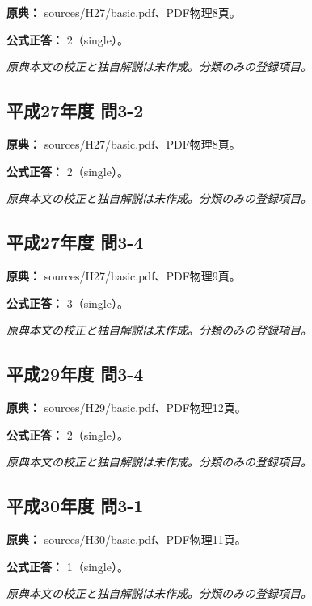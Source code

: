 \noindent\textbf{原典：} sources/H27/basic.pdf、PDF物理8頁。

\textbf{公式正答：} 2（single）。

\par\textit{原典本文の校正と独自解説は未作成。分類のみの登録項目。}

\subsection{平成27年度 問3-2}
\label{q:h27-reg-basic-3-2}

\noindent\textbf{原典：} sources/H27/basic.pdf、PDF物理8頁。

\textbf{公式正答：} 2（single）。

\par\textit{原典本文の校正と独自解説は未作成。分類のみの登録項目。}

\subsection{平成27年度 問3-4}
\label{q:h27-reg-basic-3-4}

\noindent\textbf{原典：} sources/H27/basic.pdf、PDF物理9頁。

\textbf{公式正答：} 3（single）。

\par\textit{原典本文の校正と独自解説は未作成。分類のみの登録項目。}

\subsection{平成29年度 問3-4}
\label{q:h29-reg-basic-3-4}

\noindent\textbf{原典：} sources/H29/basic.pdf、PDF物理12頁。

\textbf{公式正答：} 2（single）。

\par\textit{原典本文の校正と独自解説は未作成。分類のみの登録項目。}

\subsection{平成30年度 問3-1}
\label{q:h30-reg-basic-3-1}

\noindent\textbf{原典：} sources/H30/basic.pdf、PDF物理11頁。

\textbf{公式正答：} 1（single）。

\par\textit{原典本文の校正と独自解説は未作成。分類のみの登録項目。}

